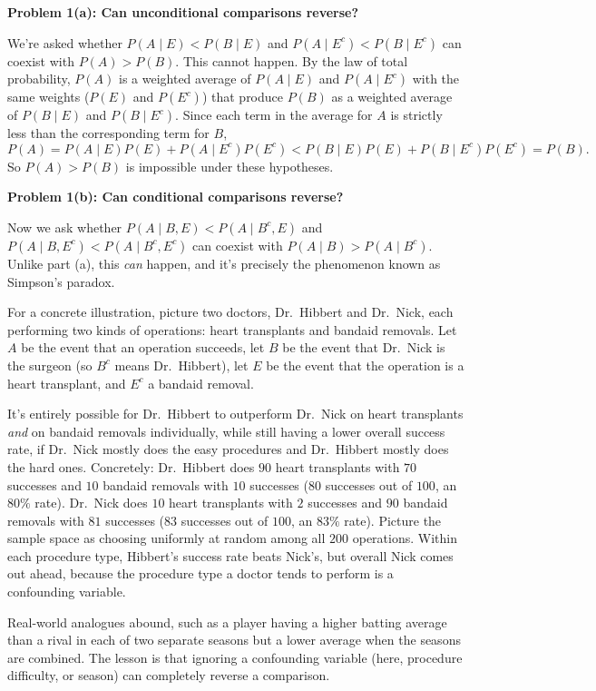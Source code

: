 \documentclass{article}
\begin{document}
\textbf{Problem 1(a): Can unconditional comparisons reverse?}

We're asked whether $P(A\mid E) < P(B\mid E)$ and $P(A\mid E^c) < P(B\mid E^c)$ can coexist with $P(A) > P(B)$. This cannot happen. By the law of total probability, $P(A)$ is a weighted average of $P(A\mid E)$ and $P(A\mid E^c)$ with the same weights ($P(E)$ and $P(E^c)$) that produce $P(B)$ as a weighted average of $P(B\mid E)$ and $P(B\mid E^c)$. Since each term in the average for $A$ is strictly less than the corresponding term for $B$,
$$
P(A) = P(A\mid E)P(E) + P(A\mid E^c)P(E^c) < P(B\mid E)P(E) + P(B\mid E^c)P(E^c) = P(B).
$$
So $P(A) > P(B)$ is impossible under these hypotheses.

\medskip
\textbf{Problem 1(b): Can conditional comparisons reverse?}

Now we ask whether $P(A\mid B,E) < P(A\mid B^c,E)$ and $P(A\mid B,E^c) < P(A\mid B^c,E^c)$ can coexist with $P(A\mid B) > P(A\mid B^c)$. Unlike part (a), this \emph{can} happen, and it's precisely the phenomenon known as Simpson's paradox.

For a concrete illustration, picture two doctors, Dr.\ Hibbert and Dr.\ Nick, each performing two kinds of operations: heart transplants and bandaid removals. Let $A$ be the event that an operation succeeds, let $B$ be the event that Dr.\ Nick is the surgeon (so $B^c$ means Dr.\ Hibbert), let $E$ be the event that the operation is a heart transplant, and $E^c$ a bandaid removal.

It's entirely possible for Dr.\ Hibbert to outperform Dr.\ Nick on heart transplants \emph{and} on bandaid removals individually, while still having a lower overall success rate, if Dr.\ Nick mostly does the easy procedures and Dr.\ Hibbert mostly does the hard ones. Concretely: Dr.\ Hibbert does $90$ heart transplants with $70$ successes and $10$ bandaid removals with $10$ successes ($80$ successes out of $100$, an $80\%$ rate). Dr.\ Nick does $10$ heart transplants with $2$ successes and $90$ bandaid removals with $81$ successes ($83$ successes out of $100$, an $83\%$ rate). Picture the sample space as choosing uniformly at random among all $200$ operations. Within each procedure type, Hibbert's success rate beats Nick's, but overall Nick comes out ahead, because the procedure type a doctor tends to perform is a confounding variable.

Real-world analogues abound, such as a player having a higher batting average than a rival in each of two separate seasons but a lower average when the seasons are combined. The lesson is that ignoring a confounding variable (here, procedure difficulty, or season) can completely reverse a comparison.
\end{document}
